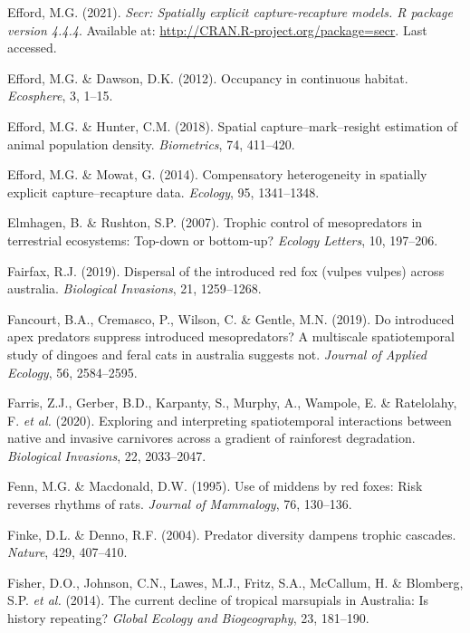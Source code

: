 \documentclass[11pt,a4paper,titlepage,twoside,openright]{style/unimelbthesis}
\begin{document}
\begin{mainmatter}
\leavevmode\hypertarget{ref-efford2021secr}{}%
Efford, M.G. (2021). \emph{Secr: Spatially explicit capture-recapture models. R package version 4.4.4}. Available at: \url{http://CRAN.R-project.org/package=secr}. Last accessed.

\leavevmode\hypertarget{ref-efford2012occupancy}{}%
Efford, M.G. \& Dawson, D.K. (2012). Occupancy in continuous habitat. \emph{Ecosphere}, 3, 1--15.

\leavevmode\hypertarget{ref-efford2018spatial}{}%
Efford, M.G. \& Hunter, C.M. (2018). Spatial capture--mark--resight estimation of animal population density. \emph{Biometrics}, 74, 411--420.

\leavevmode\hypertarget{ref-efford2014compensatory}{}%
Efford, M.G. \& Mowat, G. (2014). Compensatory heterogeneity in spatially explicit capture--recapture data. \emph{Ecology}, 95, 1341--1348.

\leavevmode\hypertarget{ref-elmhagen2007trophic}{}%
Elmhagen, B. \& Rushton, S.P. (2007). Trophic control of mesopredators in terrestrial ecosystems: Top-down or bottom-up? \emph{Ecology Letters}, 10, 197--206.

\leavevmode\hypertarget{ref-fairfax2019dispersal}{}%
Fairfax, R.J. (2019). Dispersal of the introduced red fox (vulpes vulpes) across australia. \emph{Biological Invasions}, 21, 1259--1268.

\leavevmode\hypertarget{ref-fancourt2019introduced}{}%
Fancourt, B.A., Cremasco, P., Wilson, C. \& Gentle, M.N. (2019). Do introduced apex predators suppress introduced mesopredators? A multiscale spatiotemporal study of dingoes and feral cats in australia suggests not. \emph{Journal of Applied Ecology}, 56, 2584--2595.

\leavevmode\hypertarget{ref-farris2020exploring}{}%
Farris, Z.J., Gerber, B.D., Karpanty, S., Murphy, A., Wampole, E. \& Ratelolahy, F. \emph{et al.} (2020). Exploring and interpreting spatiotemporal interactions between native and invasive carnivores across a gradient of rainforest degradation. \emph{Biological Invasions}, 22, 2033--2047.

\leavevmode\hypertarget{ref-fenn1995use}{}%
Fenn, M.G. \& Macdonald, D.W. (1995). Use of middens by red foxes: Risk reverses rhythms of rats. \emph{Journal of Mammalogy}, 76, 130--136.

\leavevmode\hypertarget{ref-finke2004predator}{}%
Finke, D.L. \& Denno, R.F. (2004). Predator diversity dampens trophic cascades. \emph{Nature}, 429, 407--410.

\leavevmode\hypertarget{ref-fisher2014current}{}%
Fisher, D.O., Johnson, C.N., Lawes, M.J., Fritz, S.A., McCallum, H. \& Blomberg, S.P. \emph{et al.} (2014). The current decline of tropical marsupials in Australia: Is history repeating? \emph{Global Ecology and Biogeography}, 23, 181--190.


\end{mainmatter}
\end{document}
